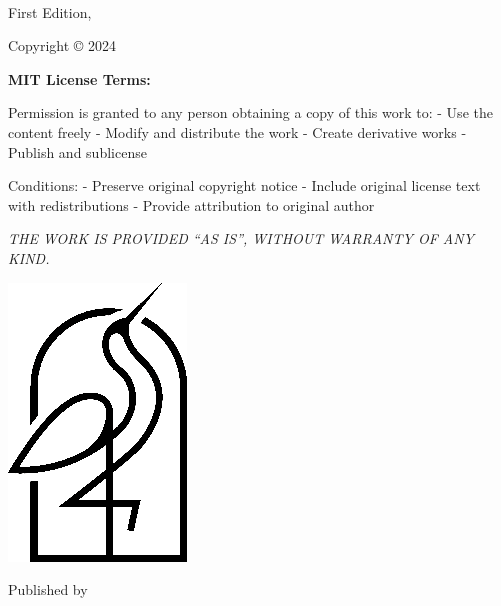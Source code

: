 {\small
\setlength{\parindent}{0em}\setlength{\parskip}{1em}
~
\vfill

First Edition, \editionyear{}

Copyright \copyright{} 2024 \authorname

{\bfseries MIT License Terms:}

Permission is granted to any person obtaining a copy of this work to:
- Use the content freely
- Modify and distribute the work
- Create derivative works
- Publish and sublicense

Conditions:
- Preserve original copyright notice
- Include original license text with redistributions
- Provide attribution to original author

{\itshape THE WORK IS PROVIDED ``AS IS'', WITHOUT WARRANTY OF ANY KIND.}

\ifx\isbn\undefined\else\if\relax\detokenize\expandafter{\isbn}\relax{}\fi\fi

\includegraphics[width=0.07\linewidth]{frontmatter/logo-black.png}

Published by \publisher{}
}
